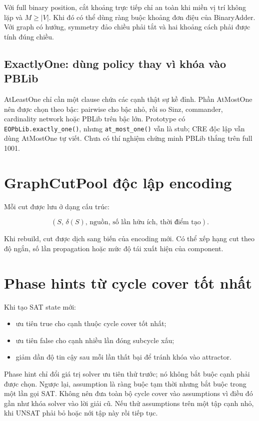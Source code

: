 \documentclass[11pt,a4paper,oneside]{scrreprt}
\newcommand{\code}[1]{\texttt{#1}}
\begin{document}
Với full binary position, cắt khoảng trực tiếp chỉ an toàn khi miền vị trí không lặp và $M\geq |V|$. Khi đó có thể dùng ràng buộc khoảng đơn điệu của BinaryAdder. Với graph có hướng, symmetry đảo chiều phải tắt và hai khoảng cách phải được tính đúng chiều.

\subsection{ExactlyOne: dùng policy thay vì khóa vào PBLib}

AtLeastOne chỉ cần một clause chứa các cạnh thật sự kề đỉnh. Phần AtMostOne nên được chọn theo bậc: pairwise cho bậc nhỏ, rồi so Sinz, commander, cardinality network hoặc PBLib trên bậc lớn. Prototype có \code{EOPbLib.exactly\_one()}, nhưng \code{at\_most\_one()} vẫn là stub; CRE độc lập vẫn dùng AtMostOne tự viết. Chưa có thí nghiệm chứng minh PBLib thắng trên full 1001.

\section{GraphCutPool độc lập encoding}

Mỗi cut được lưu ở dạng cấu trúc:

\[
  (S,\,\delta(S),\,\text{nguồn},\,\text{số lần hữu ích},\,\text{thời điểm tạo}).
\]

Khi rebuild, cut được dịch sang biến của encoding mới. Có thể xếp hạng cut theo độ ngắn, số lần propagation hoặc mức độ tái xuất hiện của component.

\section{Phase hints từ cycle cover tốt nhất}

Khi tạo SAT state mới:

\begin{itemize}
  \item ưu tiên true cho cạnh thuộc cycle cover tốt nhất;
  \item ưu tiên false cho cạnh nhiều lần đóng subcycle xấu;
  \item giảm dần độ tin cậy sau mỗi lần thất bại để tránh khóa vào attractor.
\end{itemize}

Phase hint chỉ đổi giá trị solver ưu tiên thử trước; nó không bắt buộc cạnh phải được chọn. Ngược lại, assumption là ràng buộc tạm thời nhưng bắt buộc trong một lần gọi SAT. Không nên đưa toàn bộ cycle cover vào assumptions vì điều đó gần như khóa solver vào lời giải cũ. Nếu thử assumptions trên một tập cạnh nhỏ, khi UNSAT phải bỏ hoặc nới tập này rồi tiếp tục.
\end{document}
